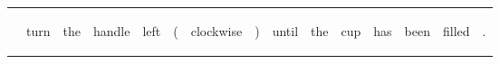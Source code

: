 \documentclass[landscape]{article}
\begin{document}
\noindent\begin{tabular}{|l|p{10pt}|p{10pt}|p{10pt}|p{10pt}|p{10pt}|p{10pt}|p{10pt}|p{10pt}|p{10pt}|p{10pt}|p{10pt}|p{10pt}|p{10pt}|p{10pt}|}
\hline
&\begin{sideways}\cellcolor{ref0}turn\hspace{12pt}\end{sideways}&\begin{sideways}\cellcolor{ref1}the\hspace{12pt}\end{sideways}&\begin{sideways}\cellcolor{ref2}handle\hspace{12pt}\end{sideways}&\begin{sideways}\cellcolor{ref3}left\hspace{12pt}\end{sideways}&\begin{sideways}\cellcolor{ref4}(\hspace{12pt}\end{sideways}&\begin{sideways}\cellcolor{ref5}clockwise\hspace{12pt}\end{sideways}&\begin{sideways}\cellcolor{ref6})\hspace{12pt}\end{sideways}&\begin{sideways}\cellcolor{ref7}until\hspace{12pt}\end{sideways}&\begin{sideways}\cellcolor{ref8}the\hspace{12pt}\end{sideways}&\begin{sideways}\cellcolor{ref9}cup\hspace{12pt}\end{sideways}&\begin{sideways}\cellcolor{ref10}has\hspace{12pt}\end{sideways}&\begin{sideways}\cellcolor{ref11}been\hspace{12pt}\end{sideways}&\begin{sideways}\cellcolor{ref12}filled\hspace{12pt}\end{sideways}&\begin{sideways}\cellcolor{ref13}.\hspace{12pt}\end{sideways}\\

\end{tabular}
\end{document}
